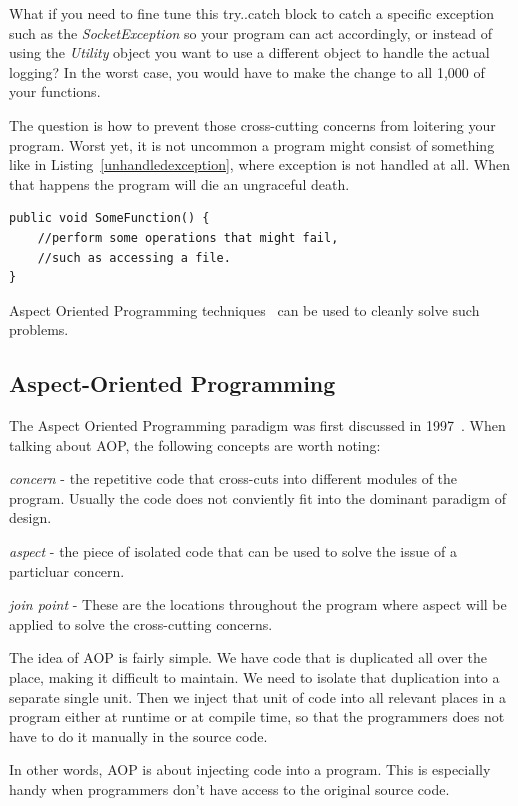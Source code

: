 What if you need to fine tune this try..catch block to catch a specific exception such as the {\em SocketException} so your program can act accordingly, or instead of using the {\em Utility} object you want to use a different object to handle the actual logging? In the worst case, you would have to make the change to all 1,000 of your functions.

The question is how to prevent those cross-cutting concerns from loitering your program. Worst yet, it is not uncommon a program might consist of something like in Listing~\ref{unhandledexception}, where exception is not handled at all. When that happens the program will die an ungraceful death.

\begin{lstlisting}[caption={Unhandle exception}, label=unhandledexception]
public void SomeFunction() {
    //perform some operations that might fail, 
    //such as accessing a file.
}
\end{lstlisting}

Aspect Oriented Programming techniques~\cite{aop} can be used to cleanly solve such problems.

\subsection{Aspect-Oriented Programming}
The Aspect Oriented Programming paradigm was first discussed in 1997~\cite{aop}. When talking about AOP, the following concepts are worth noting:

{\em concern} - the repetitive code that cross-cuts into different modules of the program. Usually the code does not conviently fit into the dominant paradigm of design.

{\em aspect} - the piece of isolated code that can be used to solve the issue of a particluar concern.

{\em join point} - These are the locations throughout the program where aspect will be applied to solve the cross-cutting concerns.

The idea of AOP is fairly simple. We have code that is duplicated all over the place, making it difficult to maintain. We need to isolate that duplication into a separate single unit. Then we inject that unit of code into all relevant places in a program either at runtime or at compile time, so that the programmers does not have to do it manually in the source code.

In other words, AOP is about injecting code into a program. This is especially handy when programmers don't have access to the original source code.

